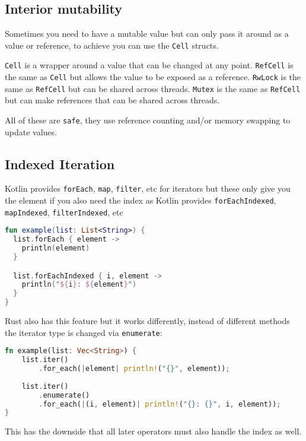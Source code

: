 \documentclass[a4paper,11pt]{article}
\begin{document}
\subsection{Interior mutability}

Sometimes you need to have a mutable value but can only pass it around as a value or reference, to achieve you can use the \lstinline[language=Rust]{Cell} structs.

\lstinline[language=Rust]{Cell} is a wrapper around a value that can be changed at any point.
\newline
\lstinline[language=Rust]{RefCell} is the same as \lstinline[language=Rust]{Cell} but allows the value to be exposed as a reference.
\newline
\lstinline[language=Rust]{RwLock} is the same as \lstinline[language=Rust]{RefCell} but can be shared across threads.
\newline
\lstinline[language=Rust]{Mutex} is the same as \lstinline[language=Rust]{RefCell} but can make references that can be shared across threads.

All of these are \lstinline[language=Rust]{safe}, they use reference counting and/or memory swapping to update values.
\medskip
\medskip
\newline
\subsection{Indexed Iteration}

Kotlin provides \lstinline[language=Kotlin]{forEach}, \lstinline[language=Kotlin]{map}, \lstinline[language=Kotlin]{filter}, etc for iterators but these only give you the element if you also need the index as Kotlin provides \lstinline[language=Kotlin]{forEachIndexed}, \lstinline[language=Kotlin]{mapIndexed}, \lstinline[language=Kotlin]{filterIndexed}, etc

\begin{lstlisting}[language=Kotlin,frame=single]
fun example(list: List<String>) {
  list.forEach { element ->
    println(element)
  }

  list.forEachIndexed { i, element ->
    println("${i}: ${element}")
  }
}
\end{lstlisting}

Rust also has this feature but it works differently, instead of different methods the iterator type is changed via \lstinline[language=Rust]{enumerate}:
\begin{lstlisting}[language=Rust,frame=single]
fn example(list: Vec<String>) {
    list.iter()
        .for_each(|element| println!("{}", element));
        
    list.iter()
        .enumerate()
        .for_each(|(i, element)| println!("{}: {}", i, element));
}
\end{lstlisting}
This has the downside that all later operators must also handle the index as well. 
\end{document}
